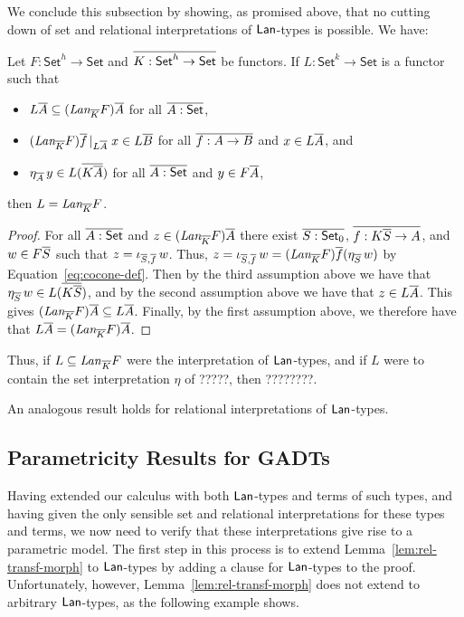 \documentclass{lmcs}
\theoremstyle{plain}\newtheorem{satz}[thm]{Satz}
\newcommand{\set}{\mathsf{Set}}
\begin{document}
\vspace*{0.05in}

We conclude this subsection by showing, as promised above, that no
cutting down of set and relational interpretations of $\mathsf{Lan}$-types is
possible. We have:

\begin{prop}\label{prop:full-lan}
Let $F : \set^h \to \set$ and $\ol{K : \set^h \to \set}$ be functors.
If $L : \set^k \to \set$ is a functor such that 
\begin{itemize}
\item $L \overline{A} \subseteq
  (\textit{Lan}_{\overline{K}} F)\overline{A}$ for all $\ol{A : \set}$,
\item $(\textit{Lan}_{\overline{K}} F)\overline{f}\,|_{L \overline{A}}\; x \in L
  \overline{B}$ for all $\overline{f : A \to B}$ and $x \in L \overline{A}$, and 
\item $\eta_{\overline{A}}\, y \in L ( \overline{K \overline{A}} )$ for all $\ol{A :
  \set}$ and $y \in F \overline{A}$, 
\end{itemize}
then $L = \textit{Lan}_{\overline{K}} F$.
\end{prop}
\begin{proof}
For all $\ol{A : \set}$ and $z \in (\textit{Lan}_{\overline{K}} F)\overline{A}$
there exist $\ol{S : \set_0}$, $\overline{f : K \overline{S} \to A}$, and $w \in F
\overline{S}$ such that $z = \iota_{\overline{S}, \overline{f}}\, w$.  Thus, $z =
\iota_{\overline{S}, \overline{f}}\, w = (\textit{Lan}_{\overline{K}} F) \overline{f}
(\eta_{\overline{S}} \,w)$ by Equation~\ref{eq:cocone-def}. Then by the
third assumption above we have that $\eta_{\overline{S}}\, w \in L (\overline{K
  \overline{S}})$, and by the second assumption above we have that $z \in L
\overline{A}$. This gives $(\textit{Lan}_{\overline{K}} F)\overline{A} \subseteq L \overline{A}$. Finally, by the first assumption above, we therefore have that $L
\overline{A} = (\textit{Lan}_{\overline{K}} F)\overline{A}$.
\end{proof}
{\color{red} Thus, if $L \subseteq \mathit{Lan}_{\overline{K}}F$ were the
  interpretation of $\mathsf{Lan}$-types, and if $L$ were to contain the set
  interpretation $\eta$ of ?????, then ????????.}

An analogous result holds for relational interpretations of
$\mathsf{Lan}$-types.

\subsection{Parametricity Results for GADTs}

Having extended our calculus with both $\mathsf{Lan}$-types and terms of such
types, and having given the only sensible set and relational
interpretations for these types and terms, we now need to verify that
these interpretations give rise to a parametric model. The first step
in this process is to extend Lemma~\ref{lem:rel-transf-morph} to
$\mathsf{Lan}$-types by adding a clause for $\mathsf{Lan}$-types to the proof.
Unfortunately, however, Lemma~\ref{lem:rel-transf-morph} does not
extend to arbitrary $\mathsf{Lan}$-types, as the following example shows.
\end{document}
